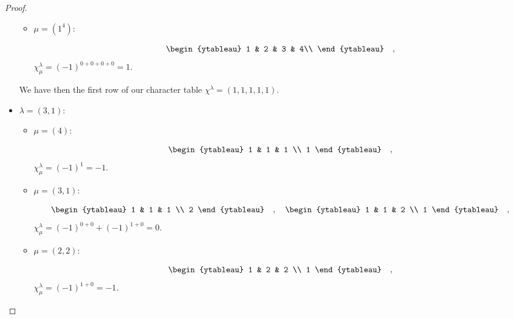 \documentclass[8pt]{extarticle}
\newcommand{\<}{\langle}
\renewcommand{\>}{\rangle}
\theoremstyle{definition}
\begin{document}
\begin{proof}
\begin{itemize}
\begin{itemize}
    \item
      $\mu = (1^4)$:

      \begin{align*}
        \begin{ytableau}
          1 & 2 & 3 & 4\\
        \end{ytableau}\quad,
      \end{align*}
      $\chi_{\mu}^{\lambda} = (-1)^{0+0+0+0} = 1$.
    \end{itemize}
    
    We have then the first row of our character table $\chi^{\lambda} = (1,1,1,1,1)$.    
  \item
    $\lambda = (3,1)$:
    
    \begin{itemize}
      
    \item
      $\mu = (4)$:
      
      \begin{align*}
        \begin{ytableau}
          1 & 1 & 1 \\
          1
        \end{ytableau}\quad,
      \end{align*}
      $\chi_{\mu}^{\lambda}  = (-1)^{1} = -1$.

    \item
      $\mu = (3,1)$:
      
      \begin{align*}
        \begin{ytableau}
          1 & 1 & 1 \\
          2
        \end{ytableau}\quad,\quad
        \begin{ytableau}
          1 & 1 & 2 \\
          1
        \end{ytableau}\quad,        
      \end{align*}
      $\chi_{\mu}^{\lambda}  = (-1)^{0+0} + (-1)^{1 + 0} = 0$.

    \item
      $\mu = (2,2)$:
      
      \begin{align*}
        \begin{ytableau}
          1 & 2 & 2 \\
          1
        \end{ytableau}\quad,        
      \end{align*}
      $\chi_{\mu}^{\lambda}  = (-1)^{1+0} = -1$.


\end{itemize}
\end{itemize}
\end{proof}
\end{document}
